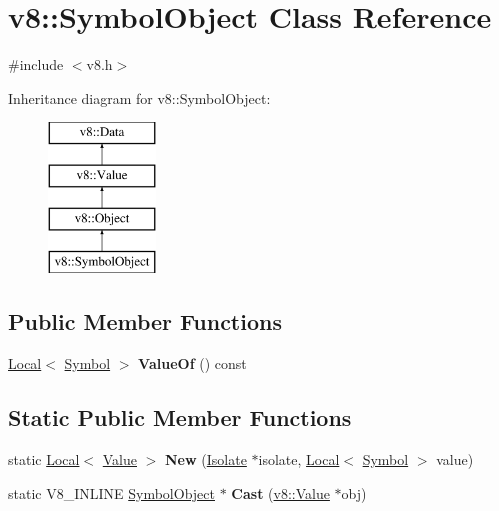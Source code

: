 \hypertarget{classv8_1_1_symbol_object}{}\section{v8\+:\+:Symbol\+Object Class Reference}
\label{classv8_1_1_symbol_object}


{\ttfamily \#include $<$v8.\+h$>$}

Inheritance diagram for v8\+:\+:Symbol\+Object\+:\begin{figure}[H]
\begin{center}
\leavevmode
\includegraphics[height=4.000000cm]{classv8_1_1_symbol_object}
\end{center}
\end{figure}
\subsection*{Public Member Functions}
\begin{DoxyCompactItemize}
\item 
\hyperlink{classv8_1_1_local}{Local}$<$ \hyperlink{classv8_1_1_symbol}{Symbol} $>$ {\bfseries Value\+Of} () const \hypertarget{classv8_1_1_symbol_object_a4a3b439c6784a4a8d9bdc5a246e12b85}{}\label{classv8_1_1_symbol_object_a4a3b439c6784a4a8d9bdc5a246e12b85}

\end{DoxyCompactItemize}
\subsection*{Static Public Member Functions}
\begin{DoxyCompactItemize}
\item 
static \hyperlink{classv8_1_1_local}{Local}$<$ \hyperlink{classv8_1_1_value}{Value} $>$ {\bfseries New} (\hyperlink{classv8_1_1_isolate}{Isolate} $\ast$isolate, \hyperlink{classv8_1_1_local}{Local}$<$ \hyperlink{classv8_1_1_symbol}{Symbol} $>$ value)\hypertarget{classv8_1_1_symbol_object_a3a3dc109d1207e4fe20671c17f5426c0}{}\label{classv8_1_1_symbol_object_a3a3dc109d1207e4fe20671c17f5426c0}

\item 
static V8\+\_\+\+I\+N\+L\+I\+NE \hyperlink{classv8_1_1_symbol_object}{Symbol\+Object} $\ast$ {\bfseries Cast} (\hyperlink{classv8_1_1_value}{v8\+::\+Value} $\ast$obj)\hypertarget{classv8_1_1_symbol_object_aa98d7c4211bd55e347ee8169143fcec9}{}\label{classv8_1_1_symbol_object_aa98d7c4211bd55e347ee8169143fcec9}

\end{DoxyCompactItemize}
